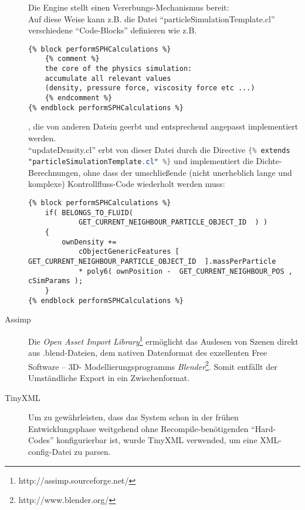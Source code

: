\begin{description}
       		Die Engine stellt einen Vererbungs-Mechanismus bereit:\\
       		Auf diese Weise kann z.B. die Datei "`particleSimulationTemplate.cl"' verschiedene "`Code-Blocks"'
       		definieren wie z.B.
       		
       		\begin{lstlisting}
{% block performSPHCalculations %}
	{% comment %}
	the core of the physics simulation: 
	accumulate all relevant values 
	(density, pressure force, viscosity force etc ...)
	{% endcomment %}               
{% endblock performSPHCalculations %}
       		\end{lstlisting}
       		
       		, die von anderen Datein geerbt und entsprechend angepasst implementiert werden.\\
       		"`updateDensity.cl"' erbt von dieser Datei durch die Directive
       		\lstinline[language=GLSL]|{% extends "particleSimulationTemplate.cl" %}| 
       		und implementiert die Dichte-Berechnungen, 
       		ohne dass der umschließende (nicht unerheblich lange und komplexe) Kontrollfluss-Code wiederholt werden muss:
       		\begin{lstlisting}
{% block performSPHCalculations %}
	if( BELONGS_TO_FLUID(
			GET_CURRENT_NEIGHBOUR_PARTICLE_OBJECT_ID  ) )
	{
		ownDensity +=                   
			cObjectGenericFeatures [ GET_CURRENT_NEIGHBOUR_PARTICLE_OBJECT_ID  ].massPerParticle
			* poly6( ownPosition -  GET_CURRENT_NEIGHBOUR_POS , cSimParams );
	}
{% endblock performSPHCalculations %}
       		\end{lstlisting}

       		
       		
    	\item[Assimp]
    	Die \emph{Open Asset Import Library}\footnote{http://assimp.sourceforge.net/} ermöglicht das Auslesen
    	von Szenen direkt aus .blend-Dateien, dem nativen Datenformat des exzellenten Free Software -- 3D-
    	Modellierungsprogramms \emph{Blender}\footnote{http://www.blender.org/}.
    	Somit entfällt der Umständliche Export in ein Zwischenformat.

    	
   		\item[TinyXML]
   		Um zu gewährleisten, dass das System schon in der frühen Entwicklungsphase weitgehend ohne 
   		Recompile-benötigenden "`Hard-Codes"' konfigurierbar ist, wurde TinyXML verwended, um eine XML-
   		config-Datei zu parsen.    	
    
	
	\end{description}	

